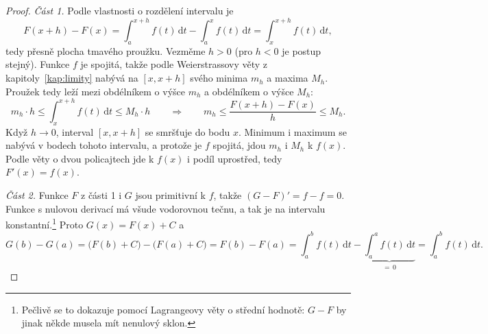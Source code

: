 \begin{proof}
  \textit{Část 1.} Podle vlastnosti o rozdělení intervalu je
  \begin{equation*}
    F(x + h) - F(x) = \int_a^{x+h}f(t)\,\mathrm{d}t - \int_a^x f(t)\,\mathrm{d}t = \int_x^{x+h}f(t)\,\mathrm{d}t,
  \end{equation*}
  tedy přesně plocha tmavého proužku. Vezměme $h > 0$ (pro $h < 0$ je postup stejný). Funkce $f$ je spojitá, takže podle Weierstrassovy věty z kapitoly~\ref{kap:limity} nabývá na $[x, x + h]$ svého minima $m_h$ a maxima $M_h$. Proužek tedy leží mezi obdélníkem o výšce $m_h$ a obdélníkem o výšce $M_h$:
  \begin{equation*}
    m_h\cdot h\leq\int_x^{x+h}f(t)\,\mathrm{d}t\leq M_h\cdot h\qquad\Longrightarrow\qquad m_h\leq\frac{F(x + h) - F(x)}{h}\leq M_h.
  \end{equation*}
  Když $h\to 0$, interval $[x, x + h]$ se smršťuje do bodu $x$. Minimum i maximum se nabývá v bodech tohoto intervalu, a protože je $f$ spojitá, jdou $m_h$ i $M_h$ k $f(x)$. Podle věty o dvou policajtech jde k $f(x)$ i podíl uprostřed, tedy $F'(x) = f(x)$.

  \textit{Část 2.} Funkce $F$ z části 1 i $G$ jsou primitivní k $f$, takže $(G - F)' = f - f = 0$. Funkce s nulovou derivací má všude vodorovnou tečnu, a tak je na intervalu konstantní.\footnote{Pečlivě se to dokazuje pomocí Lagrangeovy věty o střední hodnotě: $G - F$ by jinak někde musela mít nenulový sklon.} Proto $G(x) = F(x) + C$ a
  \begin{equation*}
    G(b) - G(a) = \big(F(b) + C\big) - \big(F(a) + C\big) = F(b) - F(a) = \int_a^b f(t)\,\mathrm{d}t - \underbrace{\int_a^a f(t)\,\mathrm{d}t}_{=\,0} = \int_a^b f(t)\,\mathrm{d}t.
  \end{equation*}
\end{proof}

\begin{center}
\end{center}

